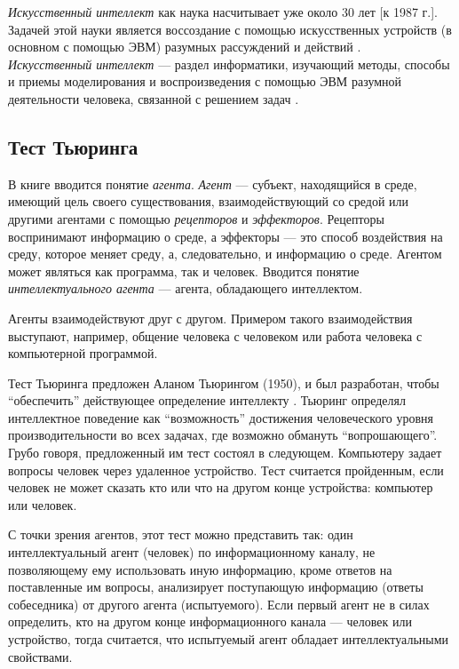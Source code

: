 \documentclass[12pt, openany, twoside]{book} %
\begin{document}
{\em Искусственный интеллект} как наука насчитывает уже около 30 лет [к 1987 г.]. Задачей этой науки является воссоздание с помощью искусственных устройств (в основном с помощью ЭВМ) разумных рассуждений и действий \cite{Lauriere}.\\
{\em Искусственный интеллект} --- раздел информатики, изучающий методы, способы и приемы моделирования и воспроизведения с помощью ЭВМ разумной деятельности человека, связанной с решением задач \cite{math_slov:88}.

\subsection{Тест Тьюринга}

В книге \cite{Russell} вводится понятие {\em агента}. {\em Агент} --- субъект, находящийся в среде, имеющий цель своего существования, взаимодействующий со средой или другими агентами с помощью {\em рецепторов} и {\em эффекторов}. Рецепторы воспринимают информацию о среде, а эффекторы --- это способ воздействия на среду, которое меняет среду, а, следовательно, и информацию о среде. Агентом может являться как программа, так и человек. Вводится понятие {\em интеллектуального агента} --- агента, обладающего интеллектом.

Агенты взаимодействуют друг с другом. Примером такого взаимодействия выступают, например, общение человека с человеком или работа человека с компьютерной программой.

Тест Тьюринга предложен Аланом Тьюрингом (1950), и был разработан, чтобы ``обеспечить'' действующее определение интеллекту \cite{Russell}. Тьюринг определял интеллектное поведение как ``возможность'' достижения человеческого уровня производительности во всех задачах, где возможно обмануть ``вопрошающего''. Грубо говоря, предложенный им тест состоял в следующем. Компьютеру задает вопросы человек через удаленное устройство. Тест считается пройденным, если человек не может сказать кто или что на другом конце устройства: компьютер или человек.

С точки зрения агентов, этот тест можно представить так: один интеллектуальный агент (человек) по информационному каналу, не позволяющему ему использовать иную информацию, кроме ответов на поставленные им вопросы, анализирует поступающую информацию (ответы собеседника) от другого агента (испытуемого). Если первый агент не в силах определить, кто на другом конце информационного канала --- человек или устройство, тогда считается, что испытуемый агент обладает интеллектуальными свойствами.
\end{document}
